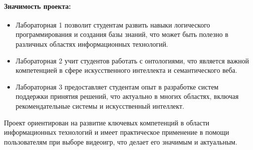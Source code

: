\documentclass[12pt,onecolumn]{article}
\begin{document}
\paragraph{Значимость проекта:}
\begin{itemize}
  \item Лабораторная 1 позволит студентам развить навыки логического программирования и создания базы знаний, что может быть полезно в различных областях информационных технологий.
  \item Лабораторная 2 учит студентов работать с онтологиями, что является важной компетенцией в сфере искусственного интеллекта и семантического веба.
  \item Лабораторная 3 предоставляет студентам опыт в разработке систем поддержки принятия решений, что актуально в многих областях, включая рекомендательные системы и искусственный интеллект.
\end{itemize}
Проект ориентирован на развитие ключевых компетенций в области информационных технологий и имеет практическое применение в помощи пользователям при выборе видеоигр, что делает его значимым и актуальным.
\end{document}
